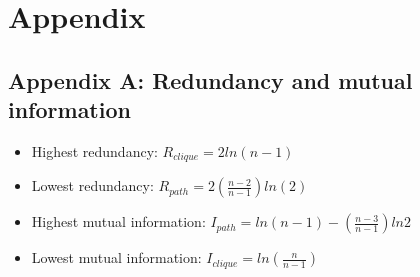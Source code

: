 \documentclass[12pt]{article}
\begin{document}
\section{Appendix}
\subsection{Appendix A: Redundancy and mutual information\cite{KIM20082637}}
\label{appendixa}
\begin{itemize}
    \item Highest redundancy: $R_{clique} = 2ln(n-1)$
    \item Lowest redundancy: $R_{path} = 2(\frac{n-2}{n-1})ln(2)$
    \item Highest mutual information: $I_{path} = ln(n-1)-(\frac{n-3}{n-1})ln2$
    \item Lowest mutual information: $I_{clique}=ln(\frac{n}{n-1})$
\end{itemize}
\end{document}
